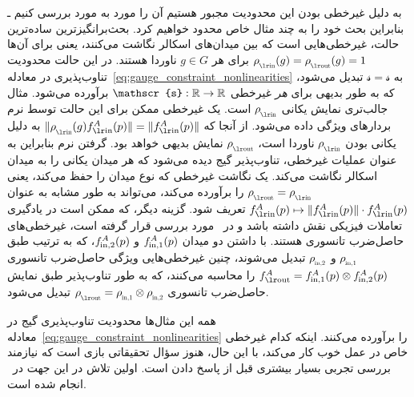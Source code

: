 به دلیل غیرخطی بودن این محدودیت مجبور هستیم آن را مورد به مورد بررسی کنیم ـ بنابراین بحث خود را به چند مثال خاص محدود خواهیم کرد.
بحث‌برانگیزترین ساده‌ترین حالت، غیرخطی‌هایی است که بین میدان‌های اسکالر نگاشت می‌کنند، یعنی برای آن‌ها $\rhoin(g) = \rhoout(g) = 1$ برای هر $g \in G$ ناوردا هستند.
در این حالت محدودیت تناوب‌پذیری در معادله~\eqref{eq:gauge_constraint_nonlinearities} به $\mathscr{s} = \mathscr{s}$ تبدیل می‌شود، که به طور بدیهی برای \emph{هر} غیرخطی $\mathscr{s}: \R \to \R$ برآورده می‌شود.
مثال جالب‌تری نمایش یکانی $\rhoin$ است.
یک غیرخطی ممکن برای این حالت توسط نرم بردارهای ویژگی داده می‌شود.
از آنجا که $\lVert \rhoin(g) \fin^A(p) \rVert = \lVert \fin^A(p) \rVert$ به دلیل یکانی بودن $\rhoin$ ناوردا است، $\rhoout$ نمایش بدیهی خواهد بود.
گرفتن نرم بنابراین به عنوان عملیات غیرخطی، تناوب‌پذیر گیج دیده می‌شود که هر میدان یکانی را به میدان اسکالر نگاشت می‌کند.
یک نگاشت غیرخطی که نوع میدان را حفظ می‌کند، یعنی $\rhoout = \rhoin$ را برآورده می‌کند، می‌تواند به طور مشابه به عنوان $\fin^A(p) \mapsto \lVert\fin^A(p)\rVert \cdot \fin^A(p)$ تعریف شود.
گزینه دیگر، که ممکن است در یادگیری تعاملات فیزیکی نقش داشته باشد و در~\cite{kondor2018ClebschGordan,Kondor2018-NBN,anderson2019cormorant,alex2020lorentz} مورد بررسی قرار گرفته است، غیرخطی‌های حاصل‌ضرب تانسوری هستند.
با داشتن دو میدان $f_\textup{\;\!\!in,1}^A(p)$ و $f_\textup{\;\!\!in,2}^A(p)$، که به ترتیب طبق
$\rho_{\overset{}{\protect\scalebox{.6}{\;\!\!\textup{in},1}}}$ و $\rho_{\overset{}{\protect\scalebox{.6}{\;\!\!\textup{in},2}}}$
تبدیل می‌شوند، چنین غیرخطی‌هایی ویژگی حاصل‌ضرب تانسوری $\fout^A = f_\textup{\;\!\!in,1}^A(p) \otimes f_\textup{\;\!\!in,2}^A(p)$ را محاسبه می‌کنند، که به طور تناوب‌پذیر طبق نمایش حاصل‌ضرب تانسوری
$\rhoout = \rho_{\overset{}{\protect\scalebox{.6}{\;\!\!\textup{in},1}}} \otimes \rho_{\overset{}{\protect\scalebox{.6}{\;\!\!\textup{in},2}}}$
تبدیل می‌شود.


همه این مثال‌ها محدودیت تناوب‌پذیری گیج در معادله~\eqref{eq:gauge_constraint_nonlinearities} را برآورده می‌کنند.
اینکه کدام غیرخطی خاص در عمل خوب کار می‌کند، با این حال، هنوز سؤال تحقیقاتی بازی است که نیازمند بررسی تجربی بسیار بیشتری قبل از پاسخ دادن است.
اولین تلاش در این جهت در~\cite{Weiler2019_E2CNN} انجام شده است.